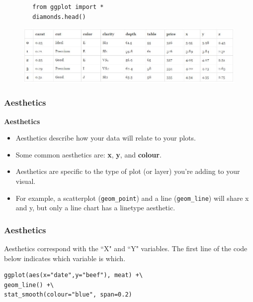 \documentclass{beamer}
\begin{document}
\begin{frame}[fragile]
	\begin{framed}
		\begin{verbatim}
		from ggplot import *
		diamonds.head()
		\end{verbatim}
	\end{framed}
	\begin{figure}
		\centering
		\includegraphics[width=1.1\linewidth]{diamondsdata}
		
	\end{figure}
	
\end{frame}	
\begin{frame}[fragile]
	\frametitle{Aesthetics}
	\Large
	\noindent \textbf{Aesthetics}
	\begin{itemize}
		\item Aesthetics describe how your data will relate to your plots.
		\item Some common aesthetics are: \textbf{x}, \textbf{y}, and \textbf{colour}. \item Aesthetics are specific to the type of plot (or layer) you're adding to your visual. 
		\item For example, a scatterplot (\texttt{geom\_point}) and a line (\texttt{geom\_line}) will share x and y, but only a line chart has a linetype aesthetic.
	\end{itemize}
	
	
\end{frame}
\begin{frame}[fragile]
	\frametitle{Aesthetics}
	\Large
Aesthetics correspond with the ``X" and ``Y" variables. The first line of the code below indicates which variable is which.
\begin{framed}
\begin{verbatim}
ggplot(aes(x="date",y="beef"), meat) +\
geom_line() +\
stat_smooth(colour="blue", span=0.2)
	\end{verbatim}
\end{framed}

\end{frame}
\end{document}
